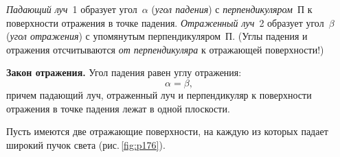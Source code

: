 \documentclass[main.tex]{subfiles}
\begin{document}
\emph{Падающий луч}~1 образует угол~$\alpha$ (\emph{угол падения}) с \emph{перпендикуляром}~П к поверхности отражения в точке падения. \emph{Отраженный луч}~2 образует угол~$\beta$ (\emph{угол отражения}) с упомянутым перпендикуляром~П. (Углы падения и отражения отсчитываются \emph{от перпендикуляра} к отражающей поверхности!) 
%
\begin{law}
    \textbf{Закон отражения.} Угол падения равен углу отражения:
    \begin{equation}
        \alpha=\beta,
    \end{equation}
    причем падающий луч, отраженный луч и перпендикуляр к поверхности отражения в точке падения лежат в одной плоскости.
\end{law}
%
Пусть имеются две отражающие поверхности, на каждую из которых падает широкий пучок света (рис.\,\ref{fig:p176}).
\end{document}

